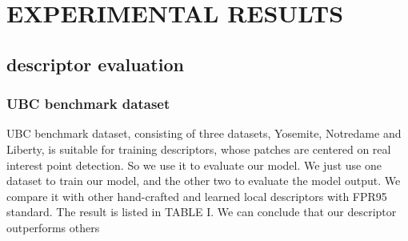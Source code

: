 \documentclass[conference]{IEEEtran}
\begin{document}
\section{EXPERIMENTAL RESULTS}


\subsection{descriptor evaluation}

\subsubsection{UBC benchmark dataset}
UBC benchmark dataset\cite{c29}, consisting of three datasets, Yosemite, Notredame and Liberty, is suitable for training descriptors, whose patches are centered on real interest point detection. So we use it to evaluate our model. We just use one dataset to train our model, and the other two to evaluate the model output. We compare it with other hand-crafted and learned local descriptors with FPR95 standard. The result is listed in TABLE I. We can conclude that our descriptor outperforms others
\end{document}
